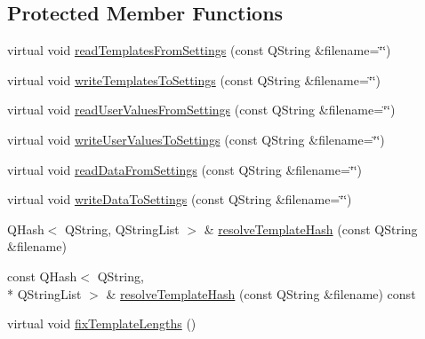 \subsection*{Protected Member Functions}
\begin{DoxyCompactItemize}
\item 
virtual void \hyperlink{classGlobalSearch_1_1Optimizer_a2e365a82ae293c91516270f5e6534960}{read\-Templates\-From\-Settings} (const Q\-String \&filename=\char`\"{}\char`\"{})
\item 
virtual void \hyperlink{classGlobalSearch_1_1Optimizer_a9c1a95c53dcdb90dce83be3ad07ac719}{write\-Templates\-To\-Settings} (const Q\-String \&filename=\char`\"{}\char`\"{})
\item 
virtual void \hyperlink{classGlobalSearch_1_1Optimizer_a5cc22352d86ce253a0aa8d9b2ee8c951}{read\-User\-Values\-From\-Settings} (const Q\-String \&filename=\char`\"{}\char`\"{})
\item 
virtual void \hyperlink{classGlobalSearch_1_1Optimizer_afa884a475b8001a43e592f466cf2318c}{write\-User\-Values\-To\-Settings} (const Q\-String \&filename=\char`\"{}\char`\"{})
\item 
virtual void \hyperlink{classGlobalSearch_1_1Optimizer_a17b4f7c9fd176d976d652598497ff70e}{read\-Data\-From\-Settings} (const Q\-String \&filename=\char`\"{}\char`\"{})
\item 
virtual void \hyperlink{classGlobalSearch_1_1Optimizer_a115e78eb651af3e0fbb9fe188d50ecdc}{write\-Data\-To\-Settings} (const Q\-String \&filename=\char`\"{}\char`\"{})
\item 
Q\-Hash$<$ Q\-String, Q\-String\-List $>$ \& \hyperlink{classGlobalSearch_1_1Optimizer_a56df447e7eab1eb64bd66f4e3bd4594d}{resolve\-Template\-Hash} (const Q\-String \&filename)
\item 
const Q\-Hash$<$ Q\-String, \\*
Q\-String\-List $>$ \& \hyperlink{classGlobalSearch_1_1Optimizer_a139e0f44d76b023c82e48149e595cbc5}{resolve\-Template\-Hash} (const Q\-String \&filename) const 
\item 
virtual void \hyperlink{classGlobalSearch_1_1Optimizer_a8205c1cb67d2111c0a9e13e78a543f00}{fix\-Template\-Lengths} ()
\end{DoxyCompactItemize}
